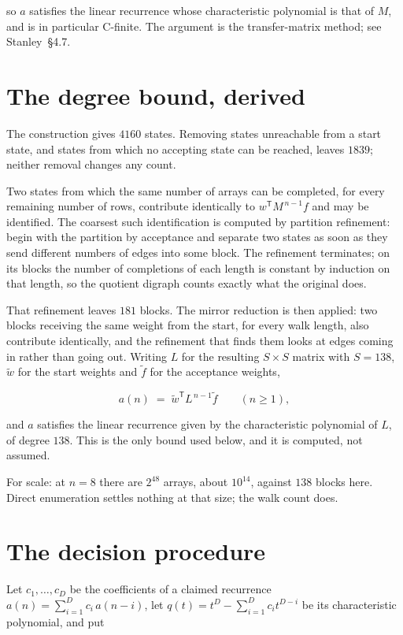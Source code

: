 \documentclass[11pt]{article}
\theoremstyle{definition}
\begin{document}
so $a$ satisfies the linear recurrence whose characteristic polynomial is that of $M$, and is in particular C-finite. The argument is the transfer-matrix method; see Stanley~\S4.7.

\section{The degree bound, derived}

The construction gives $4160$ states. Removing states unreachable from a start state, and states from which no accepting state can be reached, leaves $1839$; neither removal changes any count.

Two states from which the same number of arrays can be completed, for every remaining number of rows, contribute identically to $w^{\mathsf T}M^{\,n-1}f$ and may be identified. The coarsest such identification is computed by partition refinement: begin with the partition by acceptance and separate two states as soon as they send different numbers of edges into some block. The refinement terminates; on its blocks the number of completions of each length is constant by induction on that length, so the quotient digraph counts exactly what the original does.

That refinement leaves $181$ blocks. The mirror reduction is then applied: two blocks receiving the same weight from the start, for every walk length, also contribute identically, and the refinement that finds them looks at edges coming in rather than going out. Writing $L$ for the resulting $S \times S$ matrix with $S = 138$, $\tilde w$ for the start weights and $\tilde f$ for the acceptance weights,

\[a(n) \;=\; \tilde w^{\mathsf T} L^{\,n-1} \tilde f \qquad (n \ge 1),\]

and $a$ satisfies the linear recurrence given by the characteristic polynomial of $L$, of degree $138$. This is the only bound used below, and it is computed, not assumed.

For scale: at $n = 8$ there are $2^{48}$ arrays, about $10^{14}$, against $138$ blocks here. Direct enumeration settles nothing at that size; the walk count does.

\section{The decision procedure}

Let $c_1,\dots,c_D$ be the coefficients of a claimed recurrence $a(n) = \sum_{i=1}^{D} c_i\,a(n-i)$, let $q(t) = t^{D} - \sum_{i=1}^{D} c_i t^{D-i}$ be its characteristic polynomial, and put
\end{document}
